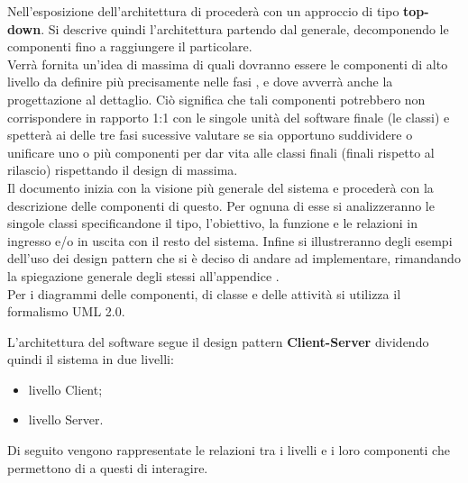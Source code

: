 
Nell'esposizione dell'architettura di procederà con un approccio di tipo \textbf{top-down}. Si descrive quindi l’architettura partendo dal generale, decomponendo le componenti fino a raggiungere il particolare.\\
Verrà fornita un'idea di massima di quali dovranno essere le componenti di alto livello da definire più precisamente nelle fasi ,  e  dove avverrà anche la progettazione al dettaglio. Ciò significa che tali componenti potrebbero non corrispondere in rapporto 1:1 con le singole unità del software finale (le classi) e spetterà ai  delle tre fasi sucessive valutare se sia opportuno suddividere o unificare uno o più componenti per dar vita alle classi finali (finali rispetto al rilascio) rispettando il design di massima.\\
Il documento inizia con la visione più generale del sistema e procederà con la descrizione delle componenti di questo. Per ognuna di esse si analizzeranno le singole classi specificandone il tipo, l'obiettivo, la funzione e le relazioni in ingresso e/o in uscita con il resto del sistema. Infine si illustreranno degli esempi dell'uso dei design pattern che si è deciso di andare ad implementare, rimandando la spiegazione generale degli stessi all'appendice .\\
Per i diagrammi delle componenti, di classe e delle attività si utilizza il formalismo UML 2.0. 


L'architettura del software segue il design pattern \textbf{Client-Server} dividendo quindi il sistema in due livelli:
\begin{itemize}
	\item{livello Client};
	\item{livello Server}.
\end{itemize}
Di seguito vengono rappresentate le relazioni tra i livelli e i loro componenti che permettono di a questi di interagire.



